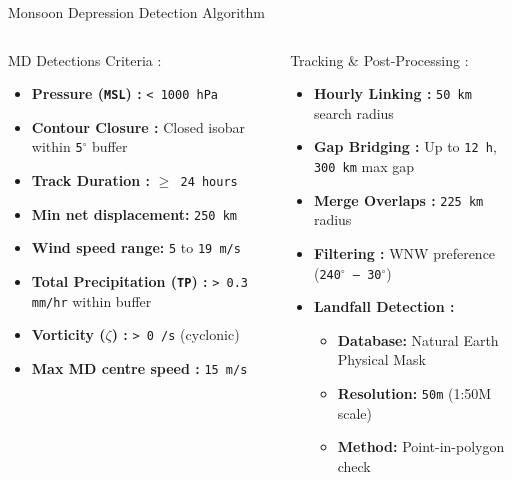 \documentclass[8pt, aspectratio=169]{beamer}
\begin{document}
\begin{frame}{Monsoon Depression Detection Algorithm}
    \vspace{-0.1cm}
    \begin{columns}[T, onlytextwidth]
        \footnotesize
        \begin{block}{MD Detections Criteria :}
            \begin{itemize}
                \item \textbf{Pressure (\texttt{MSL}) :} \texttt{< 1000 hPa}
                \item \textbf{Contour Closure :} Closed isobar within \texttt{5$^{\circ}$} buffer
                \item \textbf{Track Duration :} \texttt{$\geq$ 24 hours}
                \item \textbf{Min net displacement:} \texttt{250 km}
                \item \textbf{Wind speed range\footnotemark[1] :} \texttt{5} to \texttt{19 m/s}
                \item \textbf{Total Precipitation (\texttt{TP}) :} \texttt{> 0.3 mm/hr} within buffer
                \item \textbf{Vorticity (\texttt{$\zeta$}) :} \texttt{> 0 /s} (cyclonic)
                \item \textbf{Max MD centre speed :} \texttt{15 m/s}
            \end{itemize}
        \end{block}

        \footnotesize
        \begin{block}{Tracking \& Post-Processing :}
            \begin{itemize}
                \item \textbf{Hourly Linking :} \texttt{50 km} search radius
                \item \textbf{Gap Bridging :} Up to \texttt{12 h}, \texttt{300 km} max gap
                \item \textbf{Merge Overlaps :} \texttt{225 km} radius
                \item \textbf{Filtering :} WNW preference (\texttt{240$^{\circ}$ – 30$^{\circ}$})
                \item \textbf{Landfall Detection :}
                \begin{itemize}
                    \footnotesize
                    \item \textbf{Database:} Natural Earth Physical Mask
                    \item \textbf{Resolution:} \texttt{50m} (1:50M scale)
                    \item \textbf{Method:} Point-in-polygon check
                \end{itemize}
            \end{itemize}
        \end{block}


\end{columns}
\end{frame}
\end{document}
